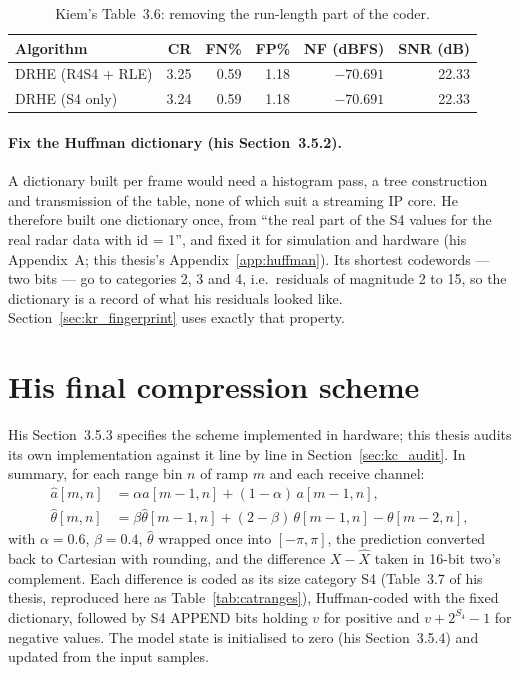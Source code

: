\begin{table}[htbp]
\centering
\caption[Kiem: DRHE without RLE]{Kiem's Table~3.6: removing the run-length
part of the coder.}
\label{tab:kiem_t36}
\small
\begin{tabular}{@{}lrrrrr@{}}
\toprule
Algorithm & CR & FN\% & FP\% & NF (dBFS) & SNR (dB)\\
\midrule
DRHE (R4S4 + RLE) & 3.25 & 0.59 & 1.18 & $-70.691$ & 22.33\\
DRHE (S4 only)    & 3.24 & 0.59 & 1.18 & $-70.691$ & 22.33\\
\bottomrule
\end{tabular}
\end{table}

\paragraph{Fix the Huffman dictionary (his Section~3.5.2).} A dictionary built
per frame would need a histogram pass, a tree construction and transmission of
the table, none of which suit a streaming IP core. He therefore built one
dictionary once, from ``the real part of the S4 values for the real radar data
with id = 1'', and fixed it for simulation and hardware (his Appendix~A; this
thesis's Appendix~\ref{app:huffman}). Its shortest codewords --- two bits ---
go to categories 2, 3 and 4, i.e.\ residuals of magnitude 2 to 15, so the
dictionary is a record of what his residuals looked like.
Section~\ref{sec:kr_fingerprint} uses exactly that property.

\section{His final compression scheme}
\label{sec:kiem_final}

His Section~3.5.3 specifies the scheme implemented in hardware; this thesis
audits its own implementation against it line by line in
Section~\ref{sec:kc_audit}. In summary, for each range bin $n$ of ramp $m$ and
each receive channel:
\begin{align}
\hat{a}[m,n] &= \alpha\hat{a}[m-1,n] + (1-\alpha)\,a[m-1,n], \\
\hat{\theta}[m,n] &= \beta\hat{\theta}[m-1,n] + (2-\beta)\,\theta[m-1,n] - \theta[m-2,n],
\end{align}
with $\alpha = 0.6$, $\beta = 0.4$, $\hat\theta$ wrapped once into
$[-\pi,\pi]$, the prediction converted back to Cartesian with rounding, and the
difference $X - \hat{X}$ taken in 16-bit two's complement. Each difference is
coded as its size category S4 (Table~3.7 of his thesis, reproduced here as
Table~\ref{tab:catranges}), Huffman-coded with the fixed dictionary, followed by
S4 APPEND bits holding $v$ for positive and $v + 2^{S_4} - 1$ for negative
values. The model state is initialised to zero (his Section~3.5.4) and updated
from the input samples.

